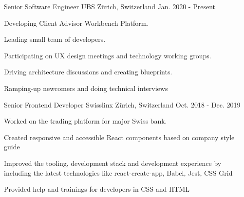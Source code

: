 

\begin{cventries}

  \cventry
    {Senior Software Engineer} %
    {UBS} %
    {Zürich, Switzerland} %
    {Jan. 2020 - Present} %
    {
      \begin{cvitems} %
        \item {Developing Client Advisor Workbench Platform.}
        \item {Leading small team of developers.}
        \item {Participating on UX design meetings and technology working groups.}
        \item {Driving architecture discussions and creating blueprints.}
        \item {Ramping-up newcomers and doing technical interviews}
      \end{cvitems}
    }

  \cventry
    {Senior Frontend Developer} %
    {Swisslinx} %
    {Zürich, Switzerland} %
    {Oct. 2018 - Dec. 2019} %
    {
      \begin{cvitems} %
        \item {Worked on the trading platform for major Swiss bank.}
        \item {Created responsive and accessible React components based on company style guide}
        \item {Improved the tooling, development stack and development experience by including the latest technologies like react-create-app, Babel, Jest, CSS Grid}
        \item {Provided help and trainings for developers in CSS and HTML}
      \end{cvitems}
    }


\end{cventries}
